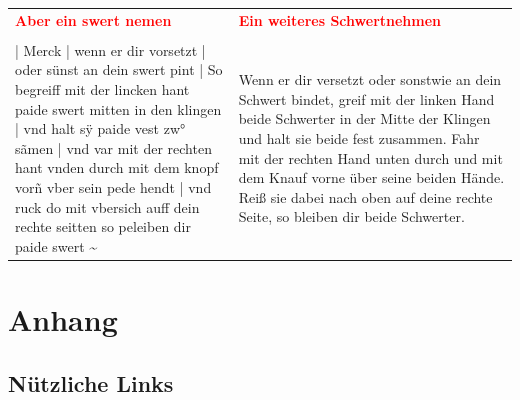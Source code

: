 \begin{longtable}{p{6.25cm}p{6.25cm}}
\textbf{\textcolor{red}{Aber ein swert nemen}}
&
\textbf{\textcolor{red}{Ein weiteres Schwertnehmen}}
\\
\\
| Merck | wenn er dir vorsetzt | oder sünst an dein swert pint | So begreiff mit der lincken hant paide swert mitten in den klingen | vnd halt sÿ paide vest zw° sãmen | vnd var mit der rechten hant vnden durch mit dem knopf vorñ vber sein pede hendt | vnd ruck do mit vbersich auff dein rechte seitten so peleiben dir paide swert \textasciitilde 
&
Wenn er dir versetzt oder sonstwie an dein Schwert bindet, greif mit der linken Hand beide Schwerter in der Mitte der Klingen und halt sie beide fest zusammen. Fahr mit der rechten Hand unten durch und mit dem Knauf vorne über seine beiden Hände. Reiß sie dabei nach oben auf deine rechte Seite, so bleiben dir beide Schwerter.
\end{longtable}

\newpage

\begin{center}
\end{center}

\newpage

\section{Anhang}

\subsection{Nützliche Links}\label{Nützliche Links}

